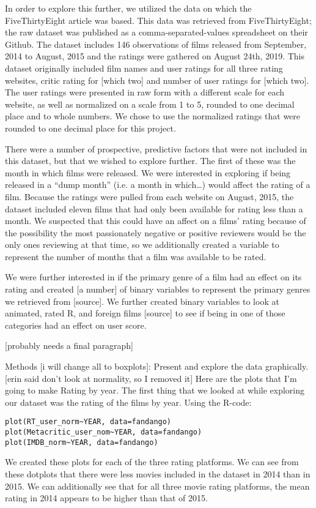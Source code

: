 \documentclass[letter,12pt]{article}
\begin{document}
	In order to explore this further, we utilized the data on which the FiveThirtyEight article was based. This data was retrieved from FiveThirtyEight; the raw dataset was published as a comma-separated-values spreadsheet on their Github. The dataset includes 146 observations of films released from September, 2014 to August, 2015 and the ratings were gathered on August 24th, 2019. This dataset originally included film names and user ratings for all three rating websites, critic rating for [which two] and number of user ratings for [which two]. The user ratings were presented in raw form with a different scale for each website, as well as normalized on a scale from 1 to 5, rounded to one decimal place and to whole numbers. We chose to use the normalized ratings that were rounded to one decimal place for this project. 

	There were a number of prospective, predictive factors that were not included in this dataset, but that we wished to explore further. The first of these was the month in which films were released. We were interested in exploring if being released in a “dump month” (i.e. a month in which…) would affect the rating of a film. Because the ratings were pulled from each website on August, 2015, the dataset included eleven films that had only been available for rating less than a month. We suspected that this could have an affect on a films’ rating because of the possibility the most passionately negative or positive reviewers would be the only ones reviewing at that time, so we additionally created a variable to represent the number of months that a film was available to be rated. 

	We were further interested in if the primary genre of a film had an effect on its rating and created [a number] of binary variables to represent the primary genres we retrieved from [source]. We further created binary variables to look at animated, rated R, and foreign films [source] to see if being in one of those categories had an effect on user score. 

	[probably needs a final paragraph]

	Methods [i will change all to boxplots]: 
	Present and explore the data graphically. 
	[erin said don’t look at normality, so I removed it] 
	Here are the plots that I’m going to make 
	Rating by year. 
	The first thing that we looked at while exploring our dataset was the rating of the films by year. Using the R-code:
\begin{verbatim}
plot(RT_user_norm~YEAR, data=fandango)
plot(Metacritic_user_nom~YEAR, data=fandango)
plot(IMDB_norm~YEAR, data=fandango)
\end{verbatim}
	We created these plots for each of the three rating platforms.
	We can see from these dotplots that there were less movies included in the dataset in 2014 than in 2015.  We can additionally see that for all three movie rating platforms, the mean rating in 2014 appears to be higher than that of 2015. 
\end{document}
